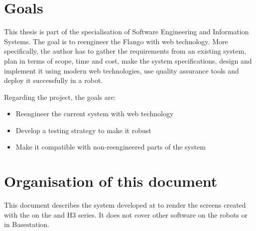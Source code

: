 \section{Goals}
This thesis is part of the specialisation of Software Engineering and Information Systems. 
The goal is to reengineer the Flango \cm with web technology.
More specifically, the author has to gather the requirements from an existing system, plan in terms of scope, time and cost, make the system specifications, design and implement it using modern web technologies, use quality assurance tools and deploy it successfully in a  robot.

Regarding the project, the goals are:
\begin{itemize}
	\item Reengineer the current system with web technology
	\item Develop a testing strategy to make it robust
	\item Make it compatible with non-reengineered parts of the system
\end{itemize}


\section{Organisation of this document}
This document describes the system developed at \company to render the screens created with the \se on the  and H3 series.
It does not cover other software on the robots or in Basestation.

